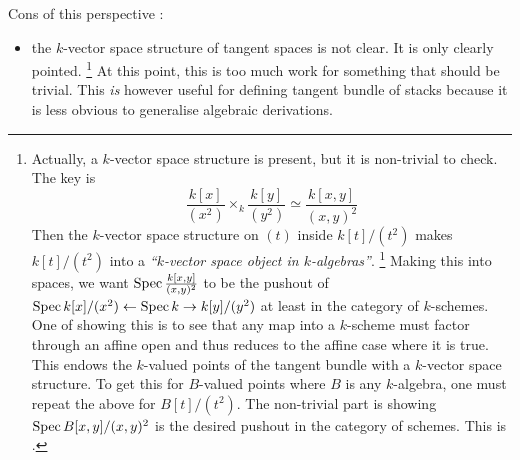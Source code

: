 \documentclass[./main.tex]{subfiles}
\begin{document}
Cons of this perspective : 
\begin{itemize}
  \item the $k$-vector space structure of tangent spaces
  is not clear.
  It is only clearly pointed.
  \footnote{
    Actually, a $k$-vector space structure is present,
  but it is non-trivial to check.
  The key is 
  \[
    \frac{k[x]}{(x^2)} \times_k \frac{k[y]}{(y^2)}
    \simeq \frac{k[x,y]}{(x,y)^2}
  \]
  Then the $k$-vector space structure on $(t)$ inside $k[t]/(t^2)$
  makes $k[t]/(t^2)$ into a
  \emph{``$k$-vector space object in $k$-algebras''}.
  \footnote{
    i.e. it is an abelian group object in $k$-algebras and
    additionally we have a monoid morphism $k \to \END_{k\dash\ALG} k[t]/(t^2)$.
  }
  Making this into spaces,
  we want $\operatorname{Spec} \frac{k[x,y]}{(x,y)^2}$ to be the pushout of
  $\operatorname{Spec} k[x]/(x^2) \leftarrow \operatorname{Spec} k \rightarrow k[y]/(y^2)$
  at least in the category of $k$-schemes.
  One of showing this is to see that any map
  into a $k$-scheme must factor through an affine open
  and thus reduces to the affine case where it is true.
  This endows the $k$-valued points of the tangent bundle with
  a $k$-vector space structure.
  To get this for $B$-valued points where $B$ is any $k$-algebra,
  one must repeat the above for $B[t]/(t^2)$.
  The non-trivial part is showing $\operatorname{Spec} B[x,y]/(x,y)^2$ 
  is the desired pushout in the category of schemes.
  This is \cite[\href{https://stacks.math.columbia.edu/tag/07RS}{Lemma 37.14.1}]{stacks}.
  }
  At this point, this is too much work for something that should be trivial.
  This \emph{is} however useful for defining tangent bundle of stacks
  because it is less obvious to generalise algebraic derivations.
\end{itemize}
\end{document}
